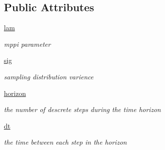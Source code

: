 \subsection*{Public Attributes}
\begin{DoxyCompactItemize}
\item 
\mbox{\label{classmppi__control_1_1mppi__lib_1_1mppi_ad88a6859f7ba1407c74749e3b29e479c}} 
\hyperlink{classmppi__control_1_1mppi__lib_1_1mppi_ad88a6859f7ba1407c74749e3b29e479c}{lam}
\begin{DoxyCompactList}\small\item\em mppi parameter \end{DoxyCompactList}\item 
\mbox{\label{classmppi__control_1_1mppi__lib_1_1mppi_abb18e20a9d313fe78a93c36528f7aa5b}} 
\hyperlink{classmppi__control_1_1mppi__lib_1_1mppi_abb18e20a9d313fe78a93c36528f7aa5b}{sig}
\begin{DoxyCompactList}\small\item\em sampling distribution varience \end{DoxyCompactList}\item 
\mbox{\label{classmppi__control_1_1mppi__lib_1_1mppi_ab60c8e4834972c05d0e919f55e1bdb36}} 
\hyperlink{classmppi__control_1_1mppi__lib_1_1mppi_ab60c8e4834972c05d0e919f55e1bdb36}{horizon}
\begin{DoxyCompactList}\small\item\em the number of descrete steps during the time horizon \end{DoxyCompactList}\item 
\mbox{\label{classmppi__control_1_1mppi__lib_1_1mppi_ad188f7133ac3b810aaa39deb0677f606}} 
\hyperlink{classmppi__control_1_1mppi__lib_1_1mppi_ad188f7133ac3b810aaa39deb0677f606}{dt}
\begin{DoxyCompactList}\small\item\em the time between each step in the horizon \end{DoxyCompactList}\item 
\mbox{\label{classmppi__control_1_1mppi__lib_1_1mppi_ac1691574dab02ec8debf400937af9048}} 

\end{DoxyCompactItemize}
